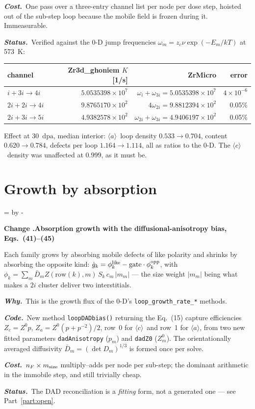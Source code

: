 \documentclass[11pt,a4paper]{article}
\newcommand{\code}[1]{\texttt{\small #1}}
\newcommand{\dpa}{\ensuremath{\mathrm{dpa}}}
\newcommand{\aloop}{\ensuremath{\langle a\rangle}}
\newcommand{\cloop}{\ensuremath{\langle c\rangle}}
\newcommand{\needlines}[1]{%
  \par\dimen0=\pagegoal \advance\dimen0 by -\pagetotal
  \ifdim\dimen0<#1\baselineskip \newpage \fi}
\newcounter{chg}
\newcommand{\change}[1]{%
  \needlines{4}%
  \refstepcounter{chg}%
  \par\medskip\noindent
  {\bfseries\boldmath Change \thechg.\quad #1}%
  \par\nobreak\smallskip}
\newcommand{\why}[1]{\par\noindent\textbf{\itshape Why.}\ #1\par}
\newcommand{\impact}[1]{\par\noindent\textbf{\itshape Code.}\ #1\par}
\newcommand{\cost}[1]{\par\noindent\textbf{\itshape Cost.}\ #1\par}
\newcommand{\status}[1]{\par\noindent\textbf{\itshape Status.}\ #1\par}
\begin{document}
\cost{One pass over a three-entry channel list per node per dose step, hoisted
out of the sub-step loop because the mobile field is frozen during it.
Immeasurable.}
\status{Verified against the 0-D jump frequencies
$\omega_m = z_c\nu\exp(-E_m/kT)$ at 573~K:

\begin{center}
\begin{tabular}{lrrr}
\toprule
channel & Zr3d\_ghoniem $K$ [1/s] & ZrMicro & error \\
\midrule
$i+3i \rightarrow 4i$  & $5.0535398\times10^{7}$ & $\omega_i+\omega_{3i}=5.0535398\times10^{7}$ & $4\times10^{-6}$ \\
$2i+2i \rightarrow 4i$ & $9.8765170\times10^{2}$ & $4\omega_{2i}=9.8812394\times10^{2}$ & 0.05\% \\
$2i+3i \rightarrow 5i$ & $4.9382578\times10^{2}$ & $\omega_{2i}+\omega_{3i}=4.9406197\times10^{2}$ & 0.05\% \\
\bottomrule
\end{tabular}
\end{center}

\noindent
Effect at 30~\dpa, median interior: \aloop\ loop density $0.533 \rightarrow
\mathbf{0.704}$, content $0.620 \rightarrow \mathbf{0.784}$, defects per loop
$1.164 \rightarrow \mathbf{1.114}$, all as ratios to the 0-D. The \cloop\
density was unaffected at $0.999$, as it must be.}

\section{Growth by absorption}

\change{Absorption growth with the diffusional-anisotropy bias, Eqs.\ (41)--(45)}
\label{chg:absorption}
Each family grows by absorbing mobile defects of like polarity and shrinks by
absorbing the opposite kind:
$\dot g_k = \phi^{\rm like}_k - \text{gate}\cdot\phi^{\rm opp}_k$, with
$\phi_k = \sum_m \bar D_m Z(\text{row}(k),m)\,S_k\,c_m\,|m_m|$ --- the
size weight $|m_m|$ being what makes a $2i$ cluster deliver two interstitials.
\why{This is the growth flux of the 0-D's \code{loop\_growth\_rate\_*}
methods.}
\impact{New method \code{loopDADbias()} returning the Eq.~(15) capture
efficiencies $Z_c = Z^0 p$, $Z_a = Z^0(p+p^{-2})/2$, row~0 for \cloop\ and
row~1 for \aloop, from two new fitted parameters \code{dadAnisotropy} ($p_m$)
and \code{dadZ0} ($Z^0_m$). The orientationally averaged diffusivity
$\bar D_m = (\det D_m)^{1/3}$ is formed once per solve.}
\cost{$n_F\times m_{\rm size}$ multiply--adds per node per sub-step; the
dominant arithmetic in the immobile step, and still trivially cheap.}
\status{The DAD reconciliation is a \emph{fitting} form, not a generated one
--- see Part~\ref{part:open}.}
\end{document}
